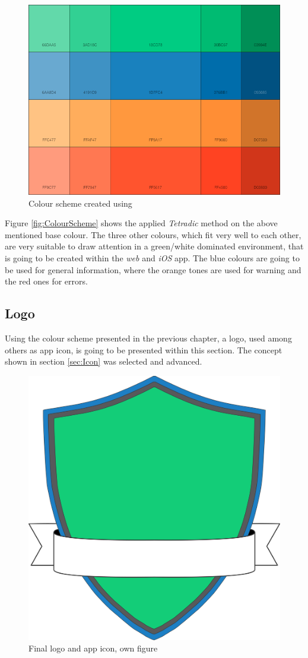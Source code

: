 \begin{figure}[h]
  	\centering
  	\includegraphics[width=0.70\linewidth]{./images/color-palette.png}
  	\caption{Colour scheme created using \cite{Paletton:2015aa}}
	\label{fig:ColourScheme}
\end{figure}

Figure \vref{fig:ColourScheme} shows the applied \emph{Tetradic} method on the above mentioned base colour. The three other colours, which fit very well to each other, are very suitable to draw attention in a green/white dominated environment, that is going to be created within the \emph{web} and \emph{iOS} app. The blue colours are going to be used for general information, where the orange tones are used for warning and the red ones for errors.

\subsection{Logo}
\label{sec:Logo}
Using the colour scheme presented in the previous chapter, a logo, used among others as app icon, is going to be presented within this section. The concept shown in section \vref{sec:Icon} was selected and advanced. 

\begin{figure}[h]
  	\centering
  	\includegraphics[width=0.45\linewidth]{./images/logo-final.png}
  	\caption{Final logo and app icon, own figure}
	\label{fig:Logo}
\end{figure}

